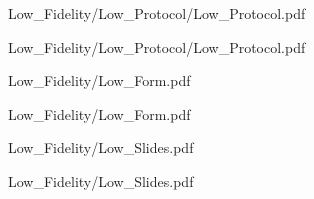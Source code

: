\documentclass[a4 paper, 12pt]{article}
\begin{document}
    \pagebreak
            
    
                    {Low_Fidelity/Low_Protocol/Low_Protocol.pdf}
    
                    {Low_Fidelity/Low_Protocol/Low_Protocol.pdf}


    \pagebreak
    
                    {Low_Fidelity/Low_Form.pdf}
    
                    {Low_Fidelity/Low_Form.pdf}

    \pagebreak
    
                    {Low_Fidelity/Low_Slides.pdf}
    
                    {Low_Fidelity/Low_Slides.pdf}
\end{document}

